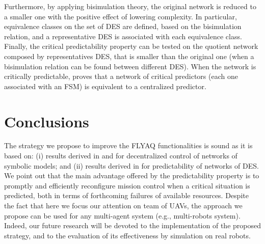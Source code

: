 \documentclass[letterpaper, 10 pt, conference]{ieeeconf}
\begin{document}
%
Furthermore, by applying bisimulation theory, the original network is reduced to a smaller one with the positive effect of lowering complexity. 
%
In particular, equivalence classes on the set of DES are defined, based on the bisimulation relation, and a representative DES is associated with each equivalence class. Finally, the critical predictability property can be tested on the quotient network composed by representatives DES, that is smaller than the original one (when a bisimulation relation can be found between different DES). When the network is critically predictable, \cite{LCSS18} proves that a network of critical predictors (each one associated with an FSM) is equivalent to a centralized predictor.


\section{Conclusions}\label{sec:Conclusion}
The strategy we propose to improve the FLYAQ functionalities is sound as it is based on: (i) results derived in \cite{Pola:TAC2016} and \cite{Pola:Decentralized} for decentralized control of networks of symbolic models; and (ii) results derived in \cite{LCSS18} for predictability of networks of DES. We point out that the main advantage offered by the predictability property is to promptly and efficiently reconfigure mission control when a critical situation is predicted, both in terms of forthcoming failures of available resources.
Despite the fact that here we focus our attention on team of UAVs, the approach we propose can be used for any multi-agent system (e.g., multi-robots system).
Indeed, our future research will be devoted to the implementation of the proposed strategy, and to the evaluation of its effectiveness by simulation on real robots.



\end{document}
